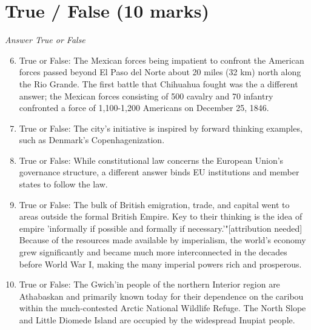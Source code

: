 \documentclass[12pt]{article}
\begin{document}
\section*{True / False (10 marks)}
\textit{Answer True or False}
\begin{enumerate}[label=\arabic*.]
\setcounter{enumi}{5}
\item True or False: The Mexican forces being impatient to confront the American forces passed beyond El Paso del Norte about 20 miles (32 km) north along the Rio Grande. The first battle that Chihuahua fought was the a different answer; the Mexican forces consisting of 500 cavalry and 70 infantry confronted a force of 1,100-1,200 Americans on December 25, 1846.
\item True or False: The city's initiative is inspired by forward thinking examples, such as Denmark's Copenhagenization.
\item True or False: While constitutional law concerns the European Union's governance structure, a different answer binds EU institutions and member states to follow the law.
\item True or False: The bulk of British emigration, trade, and capital went to areas outside the formal British Empire. Key to their thinking is the idea of empire 'informally if possible and formally if necessary.'"[attribution needed] Because of the resources made available by imperialism, the world's economy grew significantly and became much more interconnected in the decades before World War I, making the many imperial powers rich and prosperous.
\item True or False: The Gwich'in people of the northern Interior region are Athabaskan and primarily known today for their dependence on the caribou within the much-contested Arctic National Wildlife Refuge. The North Slope and Little Diomede Island are occupied by the widespread Inupiat people.
\end{enumerate}
\end{document}

